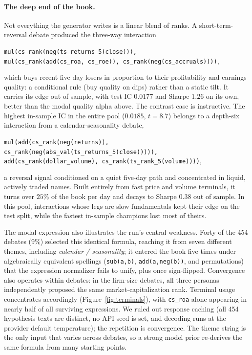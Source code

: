 \documentclass{article}
\theoremstyle{definition}
\theoremstyle{plain}
\theoremstyle{remark}
\begin{document}
\paragraph{The deep end of the book.} Not everything the generator writes is a linear
blend of ranks. A short-term-reversal debate produced the three-way interaction
\begin{center}\small
\texttt{mul(cs\_rank(neg(ts\_returns\_5(close))),}\\
\texttt{mul(cs\_rank(add(cs\_roa, cs\_roe)), cs\_rank(neg(cs\_accruals))))},
\end{center}
which buys recent five-day losers in proportion to their profitability and earnings
quality: a conditional rule (buy quality on dips) rather than a static tilt. It carries
its edge out of sample, with test IC $0.0177$ and Sharpe $1.26$ on its own, better than
the modal quality alpha above. The contrast case is instructive. The highest in-sample
IC in the entire pool ($0.0185$, $t=8.7$) belongs to a depth-six interaction from a
calendar-seasonality debate,
\begin{center}\small
\texttt{mul(add(cs\_rank(neg(returns)), cs\_rank(neg(abs\_val(ts\_returns\_5(close))))),}\\
\texttt{add(cs\_rank(dollar\_volume), cs\_rank(ts\_rank\_5(volume))))},
\end{center}
a reversal signal conditioned on a quiet five-day path and concentrated in liquid,
actively traded names. Built entirely from fast price and volume terminals, it turns
over $25\%$ of the book per day and decays to Sharpe $0.38$ out of sample. In this pool,
interactions whose legs are slow fundamentals kept their edge on the test split, while
the fastest in-sample champions lost most of theirs.

The modal expression also illustrates the run's central weakness. Forty of the 454
debates ($9\%$) selected this identical formula, reaching it from seven different
themes, including \emph{calendar / seasonality}; it entered the book five times under
algebraically equivalent spellings (\texttt{sub(a,b)}, \texttt{add(a,neg(b))}, and
permutations) that the expression normalizer fails to unify, plus once sign-flipped.
Convergence also operates within debates: in the firm-size debates, all three personas
independently proposed the same market-capitalization rank. Terminal usage concentrates
accordingly (Figure~\ref{fig:terminals}), with \texttt{cs\_roa} alone appearing in
nearly half of all surviving expressions. We ruled out response caching (all 454 hypothesis texts are
distinct, no API seed is set, and decoding runs at the provider default temperature);
the repetition is convergence. The theme string is the only input that varies across
debates, so a strong model prior re-derives the same formula from many starting points.
\end{document}
